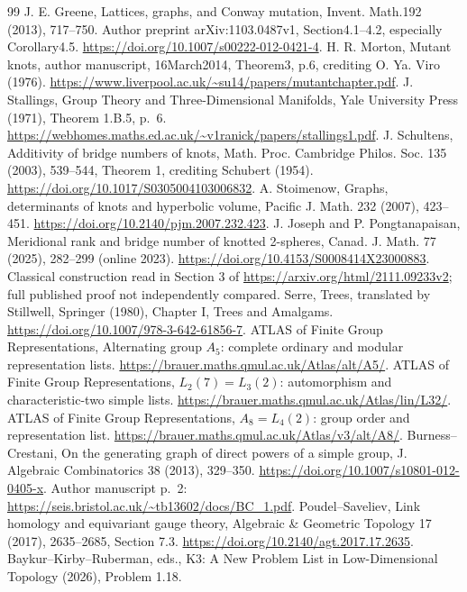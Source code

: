 \documentclass[11pt]{article}
\begin{document}
{\begin{thebibliography}{99}
 J. E. Greene, Lattices, graphs, and Conway mutation,
Invent. Math.192 (2013), 717--750. Author preprint arXiv:1103.0487v1,
Section4.1--4.2, especially Corollary4.5.
\url{https://doi.org/10.1007/s00222-012-0421-4}.
 H. R. Morton, Mutant knots, author manuscript,
16March2014, Theorem3, p.6, crediting O. Ya. Viro (1976).
\url{https://www.liverpool.ac.uk/~su14/papers/mutantchapter.pdf}.
 J. Stallings, Group Theory and Three-Dimensional
Manifolds, Yale University Press (1971), Theorem 1.B.5, p.~6.
\url{https://webhomes.maths.ed.ac.uk/~v1ranick/papers/stallings1.pdf}.
 J. Schultens, Additivity of bridge numbers of
knots, Math. Proc. Cambridge Philos. Soc. 135 (2003), 539--544,
Theorem 1, crediting Schubert (1954).
\url{https://doi.org/10.1017/S0305004103006832}.
 A. Stoimenow, Graphs, determinants of knots and
hyperbolic volume, Pacific J. Math. 232 (2007), 423--451.
\url{https://doi.org/10.2140/pjm.2007.232.423}.
 J. Joseph and P. Pongtanapaisan, Meridional rank and
bridge number of knotted 2-spheres, Canad. J. Math. 77 (2025),
282--299 (online 2023).
\url{https://doi.org/10.4153/S0008414X23000883}.
Classical construction read in Section 3 of
\url{https://arxiv.org/html/2111.09233v2}; full published proof
not independently compared.
 Serre, Trees, translated by Stillwell, Springer
(1980), Chapter I, Trees and Amalgams.
\url{https://doi.org/10.1007/978-3-642-61856-7}.
 ATLAS of Finite Group Representations, Alternating
group $A_5$: complete ordinary and modular representation lists.
\url{https://brauer.maths.qmul.ac.uk/Atlas/alt/A5/}.
 ATLAS of Finite Group Representations,
$L_2(7)=L_3(2)$: automorphism and characteristic-two simple lists.
\url{https://brauer.maths.qmul.ac.uk/Atlas/lin/L32/}.
 ATLAS of Finite Group Representations,
$A_8=L_4(2)$: group order and representation list.
\url{https://brauer.maths.qmul.ac.uk/Atlas/v3/alt/A8/}.
 Burness--Crestani, On the generating graph of direct
powers of a simple group, J. Algebraic Combinatorics 38 (2013),
329--350. \url{https://doi.org/10.1007/s10801-012-0405-x}.
Author manuscript p.~2:
\url{https://seis.bristol.ac.uk/~tb13602/docs/BC_1.pdf}.
 Poudel--Saveliev, Link homology and equivariant gauge
theory, Algebraic \& Geometric Topology 17 (2017), 2635--2685,
Section 7.3. \url{https://doi.org/10.2140/agt.2017.17.2635}.
 Baykur--Kirby--Ruberman, eds., K3: A New Problem List in
Low-Dimensional Topology (2026), Problem 1.18.

\end{thebibliography}}
\end{document}
